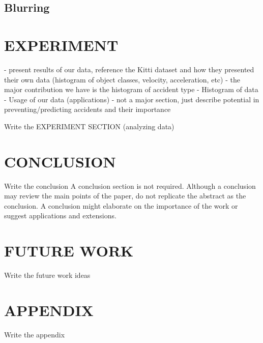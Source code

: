 \documentclass[letterpaper, 10 pt, conference]{IEEEconf}
\newcommand{\todo}[1]{{\color{red}#1}}
\begin{document}
\subsection{Blurring}


\section{EXPERIMENT}
- present results of our data, reference the Kitti dataset and how they presented their own data (histogram of object classes, velocity, acceleration, etc)
- the major contribution we have is the histogram of accident type
- Histogram of data
- Usage of our data (applications) - not a major section, just describe potential in preventing/predicting accidents and their importance


\todo{Write the EXPERIMENT SECTION (analyzing data)}


\section{CONCLUSION}

\todo{Write the conclusion}
A conclusion section is not required. Although a conclusion may review the main points of the paper, do not replicate the abstract as the conclusion. A conclusion might elaborate on the importance of the work or suggest applications and extensions.

\section{FUTURE WORK}

\todo{Write the future work ideas}

\addtolength{\textheight}{-12cm}


\section*{APPENDIX}

\todo{Write the appendix}

\byclass

\begin{center}
\end{center}
\end{document}
